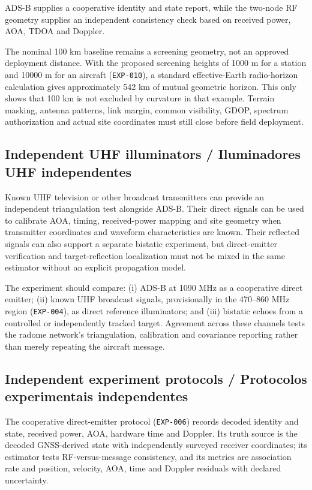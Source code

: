 ADS-B supplies a cooperative identity and state report, while the two-node RF geometry supplies an independent consistency check based on received power, AOA, TDOA and Doppler.

The nominal 100 km baseline remains a screening geometry, not an approved deployment distance. With the proposed screening heights of 1000 m for a station and 10000 m for an aircraft (\texttt{EXP-010}), a standard effective-Earth radio-horizon calculation gives approximately 542 km of mutual geometric horizon. This only shows that 100 km is not excluded by curvature in that example. Terrain masking, antenna patterns, link margin, common visibility, GDOP, spectrum authorization and actual site coordinates must still close before field deployment.

\subsection*{Independent UHF illuminators / Iluminadores UHF independentes}
Known UHF television or other broadcast transmitters can provide an independent triangulation test alongside ADS-B. Their direct signals can be used to calibrate AOA, timing, received-power mapping and site geometry when transmitter coordinates and waveform characteristics are known. Their reflected signals can also support a separate bistatic experiment, but direct-emitter verification and target-reflection localization must not be mixed in the same estimator without an explicit propagation model.

The experiment should compare: (i) ADS-B at 1090 MHz as a cooperative direct emitter; (ii) known UHF broadcast signals, provisionally in the 470--860 MHz region (\texttt{EXP-004}), as direct reference illuminators; and (iii) bistatic echoes from a controlled or independently tracked target. Agreement across these channels tests the radome network's triangulation, calibration and covariance reporting rather than merely repeating the aircraft message.

\subsection*{Independent experiment protocols / Protocolos experimentais independentes}
The cooperative direct-emitter protocol (\texttt{EXP-006}) records decoded identity and state, received power, AOA, hardware time and Doppler. Its truth source is the decoded GNSS-derived state with independently surveyed receiver coordinates; its estimator tests RF-versus-message consistency, and its metrics are association rate and position, velocity, AOA, time and Doppler residuals with declared uncertainty.

